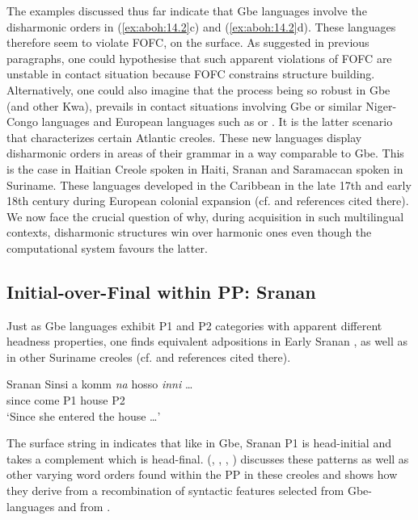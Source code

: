 \documentclass[output=paper]{langsci/langscibook}
\begin{document}
The examples discussed thus far indicate that Gbe languages involve the
disharmonic orders in (\ref{ex:aboh:14.2}c) and (\ref{ex:aboh:14.2}d). These languages therefore seem to violate
FOFC, on the surface. As suggested in previous paragraphs, one could
hypothesise that such apparent violations of \gls{FOFC} are unstable in contact
situation because \gls{FOFC} constrains structure building.  Alternatively, one could
also imagine that the process being so robust in Gbe (and other Kwa), prevails
in contact situations involving Gbe or similar Niger-Congo languages and
European languages such as  or . It is the latter scenario that
characterizes certain Atlantic creoles. These new languages display disharmonic
orders in areas of their grammar in a way comparable to Gbe. This is the case
in Haitian Creole spoken in Haiti, Sranan and Saramaccan spoken in Suriname.
These languages developed in the Caribbean in the late 17th and early 18th
century during European colonial expansion (cf. \citealt{Aboh2015} and
references cited there).
%
We now face the crucial question of why, during acquisition in such
multilingual contexts, disharmonic structures win over harmonic ones even
though the computational system favours the latter.

\subsection{Initial-over-Final within PP: Sranan}

Just as Gbe languages exhibit P1 and P2 categories with apparent different
headness properties, one finds equivalent adpositions in Early Sranan
, as well as in other Suriname creoles (cf. \citealt{Bruyn2003}
and references cited there).

\ea\label{ex:aboh:14.11b} Sranan \parencite[32]{Bruyn2003}
    \sn\gll Sinsi a komm \textit{na} hosso \textit{inni} \dots{} \\
            since \Tsg{} come P1 house P2 {} \\
    \glt    \enquote*{Since she entered the house \dots{}}
\z

The surface string in  indicates that like in Gbe, Sranan P1 is
head-initial and takes a complement which is head-final.
\citeauthor{Aboh2010c} (\citeyear{Aboh2010c}, \citeyear{Aboh2015},
\citeyear{Aboh2016b}, \citeyear{Aboh2017}) discusses these patterns as
well as other varying word orders found within the PP in these creoles and
shows how they derive from a recombination of syntactic features selected from
Gbe-languages and from .
\end{document}
